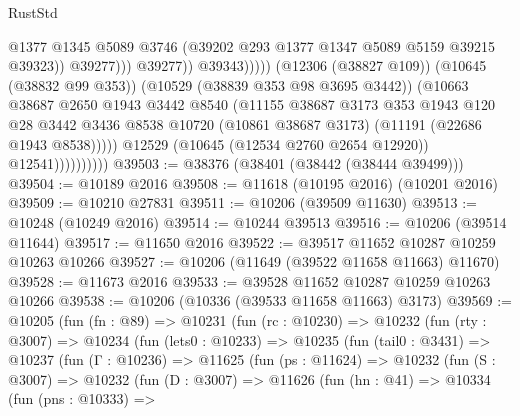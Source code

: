 \begin{lexlean}{RustStd}
\begin{coremodule}
                                                @1377
                                                @1345
                                                @5089
                                                @3746
                                                (@39202 @293 @1377 @1347 @5089 @5159 @39215 @39323))
                                              @39277)))
                                        @39277))
                                    @39343)))))
                          (@12306 (@38827 @109))
                          (@10645 (@38832 @99 @353))
                          (@10529 (@38839 @353 @98 @3695 @3442))
                          (@10663
                            @38687
                            @2650
                            @1943
                            @3442
                            @8540
                            (@11155
                              @38687
                              @3173
                              @353
                              @1943
                              @120
                              @28
                              @3442
                              @3436
                              @8538
                              @10720
                              (@10861 @38687 @3173)
                              (@11191 (@22686 @1943 @8538)))))
                        @12529
                        (@10645 (@12534 @2760 @2654 @12920))
                        @12541))))))))))
@39503 := @38376 (@38401 (@38442 (@38444 @39499)))
@39504 := @10189 @2016
@39508 := @11618 (@10195 @2016) (@10201 @2016)
@39509 := @10210 @27831
@39511 := @10206 (@39509 @11630)
@39513 := @10248 (@10249 @2016)
@39514 := @10244 @39513
@39516 := @10206 (@39514 @11644)
@39517 := @11650 @2016
@39522 := @39517 @11652 @10287 @10259 @10263 @10266
@39527 := @10206 (@11649 (@39522 @11658 @11663) @11670)
@39528 := @11673 @2016
@39533 := @39528 @11652 @10287 @10259 @10263 @10266
@39538 := @10206 (@10336 (@39533 @11658 @11663) @3173)
@39569 := @10205
    (fun (fn : @89) =>
    @10231
      (fun (rc : @10230) =>
      @10232
        (fun (rty : @3007) =>
        @10234
          (fun (lets0 : @10233) =>
          @10235
            (fun (tail0 : @3431) =>
            @10237
              (fun (Γ : @10236) =>
              @11625
                (fun (ps : @11624) =>
                @10232
                  (fun (S : @3007) =>
                  @10232
                    (fun (D : @3007) =>
                    @11626
                      (fun (hn : @41) =>
                      @10334
                        (fun (pns : @10333) =>

\end{coremodule}
\end{lexlean}
